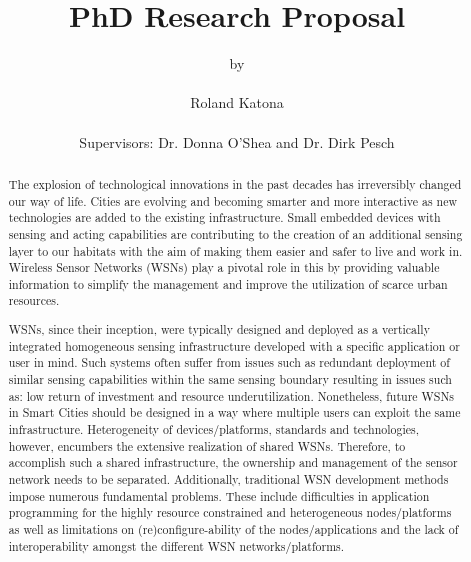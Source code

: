 \documentclass[11pt]{article}
\title{PhD Research Proposal}
\author{by \\ \\ Roland Katona \\ \\ Supervisors:  Dr. Donna O'Shea and  Dr. Dirk Pesch}
\begin{document}

\singlespace
\maketitle



\begin{abstract}   
The explosion of technological innovations in the past decades has irreversibly changed
our way of life. Cities are evolving and becoming smarter and more interactive as new
technologies are added to the existing infrastructure. Small embedded devices with sensing and acting capabilities are contributing to the creation of an additional sensing layer to our
habitats with the aim of making them easier and safer to live and work in. Wireless Sensor Networks (WSNs) play a pivotal role in this by providing valuable information to simplify the management and improve the utilization of scarce urban resources.

WSNs, since their inception, were typically designed and
deployed as a vertically integrated homogeneous sensing infrastructure developed with a specific application or user in mind. Such systems often suffer from issues such as redundant deployment of similar sensing capabilities within the same sensing boundary resulting in issues such as: low return of investment and resource underutilization. 
Nonetheless, future WSNs in Smart Cities should be designed in a way where multiple users can exploit the same infrastructure. Heterogeneity of devices/platforms, standards and technologies, however, encumbers the extensive realization of shared WSNs. Therefore, to accomplish such a shared infrastructure, the ownership and management of the sensor network needs to be separated.  Additionally, traditional WSN development methods impose numerous fundamental problems. These include difficulties in application programming for the highly resource constrained and heterogeneous nodes/platforms as well as limitations on (re)configure-ability of the nodes/applications and the lack of interoperability amongst the different WSN networks/platforms. 




\end{abstract}
\end{document}
